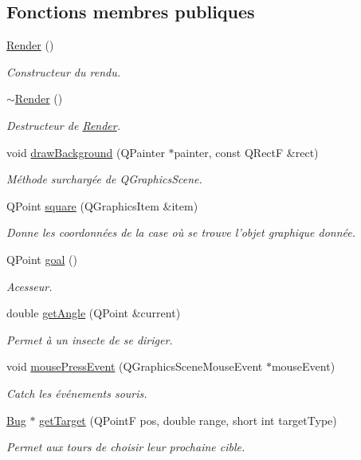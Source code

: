 \subsection*{Fonctions membres publiques}
\begin{DoxyCompactItemize}
\item 
\hyperlink{classRender_a8610cc11739ef679b5935dd819021351}{Render} ()
\begin{DoxyCompactList}\small\item\em Constructeur du rendu. \end{DoxyCompactList}\item 
\hyperlink{classRender_ab0f4b917605cb15902f8d045a4197faf}{$\sim$Render} ()
\begin{DoxyCompactList}\small\item\em Destructeur de \hyperlink{classRender}{Render}. \end{DoxyCompactList}\item 
void \hyperlink{classRender_aae10ca06c2755038752a2a007727f0ca}{drawBackground} (QPainter $\ast$painter, const QRectF \&rect)
\begin{DoxyCompactList}\small\item\em Méthode surchargée de QGraphicsScene. \end{DoxyCompactList}\item 
QPoint \hyperlink{classRender_a1291eebbb0647502fc90d058bc22e7a3}{square} (QGraphicsItem \&item)
\begin{DoxyCompactList}\small\item\em Donne les coordonnées de la case où se trouve l'objet graphique donnée. \end{DoxyCompactList}\item 
QPoint \hyperlink{classRender_afd1f727c1514ca01ad1cefbf4992497b}{goal} ()
\begin{DoxyCompactList}\small\item\em Acesseur. \end{DoxyCompactList}\item 
double \hyperlink{classRender_a696f385b556f15a7420293a055734e4d}{getAngle} (QPoint \&current)
\begin{DoxyCompactList}\small\item\em Permet à un insecte de se diriger. \end{DoxyCompactList}\item 
void \hyperlink{classRender_a899ce19de8a01bb4bc01653cd8761357}{mousePressEvent} (QGraphicsSceneMouseEvent $\ast$mouseEvent)
\begin{DoxyCompactList}\small\item\em Catch les événements souris. \end{DoxyCompactList}\item 
\hyperlink{classBug}{Bug} $\ast$ \hyperlink{classRender_a8074fc252757d5c446d79f8205348116}{getTarget} (QPointF pos, double range, short int targetType)
\begin{DoxyCompactList}\small\item\em Permet aux tours de choisir leur prochaine cible. \end{DoxyCompactList}\end{DoxyCompactItemize}
